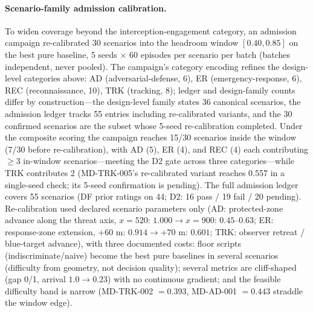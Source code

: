 \documentclass[sigconf,anonymous]{aamas}
\begin{document}
\paragraph{Scenario-family admission calibration.}
To widen coverage beyond the interception-engagement category, an admission campaign re-calibrated 30 scenarios into the headroom window $[0.40, 0.85]$ on the best pure baseline, 5 seeds $\times$ 60 episodes per scenario per batch (batches independent, never pooled). The campaign's category encoding refines the design-level categories above: AD (adversarial-defense, 6), ER (emergency-response, 6), REC (reconnaissance, 10), TRK (tracking, 8); ledger and design-family counts differ by construction---the design-level family states 36 canonical scenarios, the admission ledger tracks 55 entries including re-calibrated variants, and the 30 confirmed scenarios are the subset whose 5-seed re-calibration completed. Under the composite scoring the campaign reaches 15/30 scenarios inside the window (7/30 before re-calibration), with AD (5), ER (4), and REC (4) each contributing $\geq 3$ in-window scenarios---meeting the D2 gate across three categories---while TRK contributes 2 (MD-TRK-005's re-calibrated variant reaches 0.557 in a single-seed check; its 5-seed confirmation is pending). The full admission ledger covers 55 scenarios (DF prior ratings on 44; D2: 16 pass / 19 fail / 20 pending). Re-calibration used declared scenario parameters only (AD: protected-zone advance along the threat axis, $x=520$: $1.000 \rightarrow x=900$: $0.45$--$0.63$; ER: response-zone extension, $+60$ m: $0.914 \rightarrow +70$ m: $0.601$; TRK: observer retreat / blue-target advance), with three documented costs: floor scripts (indiscriminate/naive) become the best pure baselines in several scenarios (difficulty from geometry, not decision quality); several metrics are cliff-shaped (gap 0/1, arrival $1.0 \rightarrow 0.23$) with no continuous gradient; and the feasible difficulty band is narrow (MD-TRK-002 $=0.393$, MD-AD-001 $=0.443$ straddle the window edge).
\end{document}
